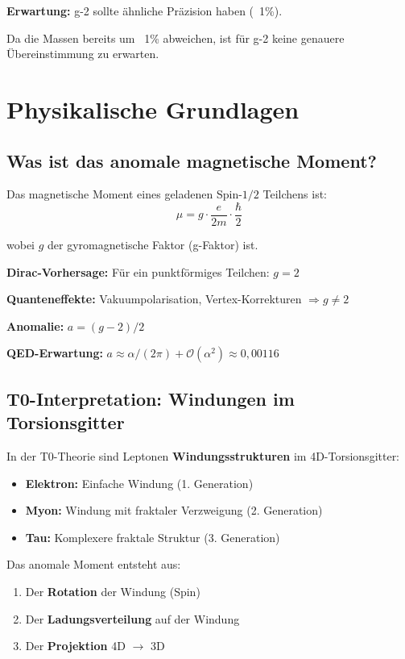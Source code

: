 	\textbf{Erwartung:} g-2 sollte ähnliche Präzision haben (~1\%).
	
	Da die Massen bereits um ~1\% abweichen, ist für g-2 keine genauere Übereinstimmung zu erwarten.
	
	\section{Physikalische Grundlagen}
	
	\subsection{Was ist das anomale magnetische Moment?}
	
	Das magnetische Moment eines geladenen Spin-$1/2$ Teilchens ist:
	\begin{equation}
		\mu = g \cdot \frac{e}{2m} \cdot \frac{\hbar}{2}
	\end{equation}
	
	wobei $g$ der gyromagnetische Faktor (g-Faktor) ist.
	
	\textbf{Dirac-Vorhersage:} Für ein punktförmiges Teilchen: $g = 2$
	
	\textbf{Quanteneffekte:} Vakuumpolarisation, Vertex-Korrekturen $\Rightarrow g \neq 2$
	
	\textbf{Anomalie:} $a = (g-2)/2$
	
	\textbf{QED-Erwartung:} $a \approx \alpha/(2\pi) + \mathcal{O}(\alpha^2) \approx 0{,}00116$
	
	\subsection{T0-Interpretation: Windungen im Torsionsgitter}
	
	In der T0-Theorie sind Leptonen \textbf{Windungsstrukturen} im 4D-Torsionsgitter:
	
	\begin{itemize}
		\item \textbf{Elektron:} Einfache Windung (1. Generation)
		\item \textbf{Myon:} Windung mit fraktaler Verzweigung (2. Generation)
		\item \textbf{Tau:} Komplexere fraktale Struktur (3. Generation)
	\end{itemize}
	
	Das anomale Moment entsteht aus:
	\begin{enumerate}
		\item Der \textbf{Rotation} der Windung (Spin)
		\item Der \textbf{Ladungsverteilung} auf der Windung
		\item Der \textbf{Projektion} 4D $\to$ 3D
	\end{enumerate}
	
